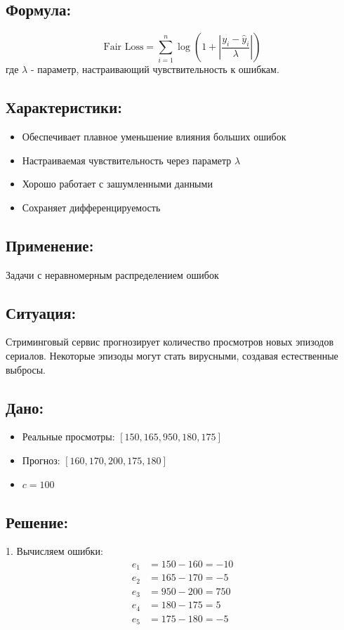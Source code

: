 \subsection*{Формула:}

\[
\text{Fair Loss} = \sum_{i=1}^{n} \log\left(1 + \left|\frac{y_i - \hat{y}_i}{\lambda}\right|\right)
\]
где $\lambda$ - параметр, настраивающий чувствительность к ошибкам.

\subsection*{Характеристики:}
\begin{itemize}
    \item Обеспечивает плавное уменьшение влияния больших ошибок
    \item Настраиваемая чувствительность через параметр $\lambda$
    \item Хорошо работает с зашумленными данными
    \item Сохраняет дифференцируемость
\end{itemize}

\subsection*{Применение:} Задачи с неравномерным распределением ошибок

\subsection*{Ситуация:} Стриминговый сервис прогнозирует количество просмотров новых эпизодов сериалов. Некоторые эпизоды могут стать вирусными, создавая естественные выбросы.

\subsection*{Дано:}
\begin{itemize}
    \item Реальные просмотры: $[150, 165, 950, 180, 175]$
    \item Прогноз: $[160, 170, 200, 175, 180]$
    \item $c = 100$
\end{itemize}

\subsection*{Решение:}
1. Вычисляем ошибки:
\[
\begin{aligned}
e_1 &= 150 - 160 = -10 \\
e_2 &= 165 - 170 = -5 \\
e_3 &= 950 - 200 = 750 \\
e_4 &= 180 - 175 = 5 \\
e_5 &= 175 - 180 = -5
\end{aligned}
\]

